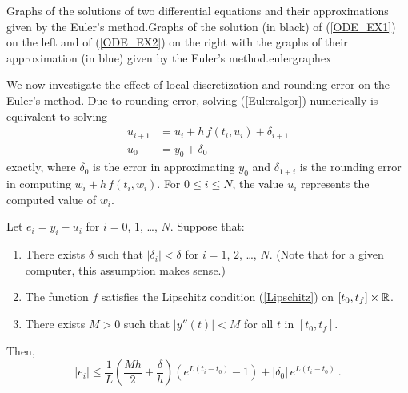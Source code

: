 {Graphs of the solutions of two differential equations and their
approximations given by the Euler's method.}{Graphs of the
solution (in black) of (\ref{ODE_EX1}) on the left and of
(\ref{ODE_EX2}) on the right with the graphs of their approximation (in
blue) given by the Euler's method.}{eulergraphex}

We now investigate the effect of local discretization and rounding
error on the Euler's method.  Due to rounding error, solving
(\ref{Euleralgor}) numerically is equivalent to solving
\begin{equation} \label{Eulerpertub}
\begin{split}
u_{i+1} & = u_i + h \, f(t_i, u_i) + \delta_{i+1}\\
u_0 & = y_0 + \delta_0
\end{split}
\end{equation}
exactly, where $\delta_0$ is the error in approximating $y_0$ and
$\delta_{1+i}$ is the rounding error in computing
$w_i+h\,f(t_i,w_i)$.  For $0 \leq i \leq N$, the value $u_i$
represents the computed value of $w_i$.

\begin{theorem}
Let $e_i = y_i - u_i$ for $i=0$, $1$, \ldots, $N$.  Suppose that:
\begin{enumerate}
\item There exists $\delta$ such that $|\delta_i| < \delta$ for $i=1$,
$2$, \ldots, $N$.  (Note that for a given computer, this assumption
makes sense.)
\item The function $f$ satisfies the Lipschitz condition
(\ref{Lipschitz}) on $[t_0,t_f]\times \mathbb{R}$.
\item There exists $M>0$ such that $|y''(t)| < M$ for all $t$ in
$[t_0,t_f]$.
\end{enumerate}
Then,
\begin{equation}\label{abserrEuler}
|e_i| \leq \frac{1}{L}\left(\frac{Mh}{2} + \frac{\delta}{h} \right)\left(
e^{L(t_i-t_0)} - 1 \right) + |\delta_0|\,e^{L(t_i-t_0)} \ .
\end{equation}
\label{Eulererrorbound}
\end{theorem}


